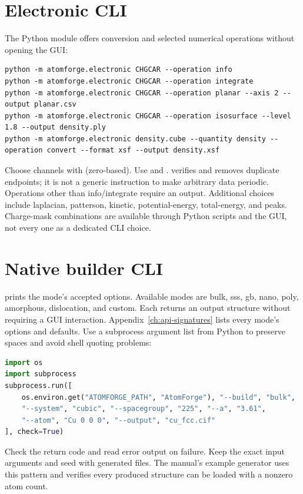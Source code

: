 \section{Electronic CLI}
The Python module offers conversion and selected numerical operations without opening the GUI:
\begin{lstlisting}
python -m atomforge.electronic CHGCAR --operation info
python -m atomforge.electronic CHGCAR --operation integrate
python -m atomforge.electronic CHGCAR --operation planar --axis 2 --output planar.csv
python -m atomforge.electronic CHGCAR --operation isosurface --level 1.8 --output density.ply
python -m atomforge.electronic density.cube --quantity density --operation convert --format xsf --output density.xsf
\end{lstlisting}
Choose channels with  (zero-based). Use  and .  verifies and removes duplicate endpoints; it is not a generic instruction to make arbitrary data periodic. Operations other than info/integrate require an output. Additional choices include laplacian, patterson, kinetic, potential-energy, total-energy, and peaks. Charge-mask combinations are available through Python scripts and the GUI, not every one as a dedicated CLI choice.

\section{Native builder CLI}
 prints the mode's accepted options. Available modes are bulk, sss, gb, nano, poly, amorphous, dislocation, and custom. Each returns an output structure without requiring a GUI interaction. Appendix~\ref{ch:api-signatures} lists every mode's options and defaults. Use a subprocess argument list from Python to preserve spaces and avoid shell quoting problems:
\begin{lstlisting}[language=Python]
import os
import subprocess
subprocess.run([
    os.environ.get("ATOMFORGE_PATH", "AtomForge"), "--build", "bulk",
    "--system", "cubic", "--spacegroup", "225", "--a", "3.61",
    "--atom", "Cu 0 0 0", "--output", "cu_fcc.cif"
], check=True)
\end{lstlisting}
Check the return code and read error output on failure. Keep the exact input arguments and seed with generated files. The manual's example generator uses this pattern and verifies every produced structure can be loaded with a nonzero atom count.

